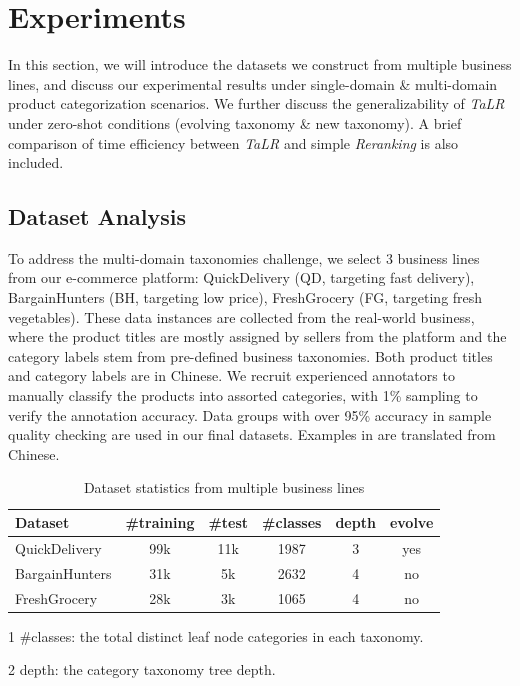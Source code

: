 \section{Experiments}
In this section, we will introduce the datasets we construct from multiple business lines, and discuss our experimental results under single-domain \& multi-domain product categorization scenarios. We further discuss the generalizability of \textit{TaLR} under zero-shot conditions (evolving taxonomy  \& new taxonomy). A brief comparison of time efficiency between \textit{TaLR} and simple \textit{Reranking} is also included. 

\subsection{Dataset Analysis}
To address the multi-domain taxonomies challenge, we select 3 business lines from our e-commerce platform: 
QuickDelivery (QD, targeting fast delivery), BargainHunters (BH, targeting low price), FreshGrocery (FG, targeting fresh vegetables). 
These data instances 
are collected from the real-world business, where the product titles are mostly assigned by sellers from the platform and the category labels stem from pre-defined business taxonomies. Both product titles and category labels are in Chinese. We recruit experienced annotators to manually classify the products into assorted categories, with 1\% sampling to verify the annotation accuracy. Data groups with over 95\% accuracy in sample quality checking are used in our final datasets. 
Examples in  are translated from Chinese.

\begin{table}[th]
\begin{threeparttable}[b]
  \caption{Dataset statistics from multiple business lines}
  \label{tb:dataset}
  \centering
  \begin{tabular}{l|ccccc}
    \toprule
    Dataset & \#training  & \#test  & \#classes & depth  & evolve \\
    \midrule
    \small{QuickDelivery} & 99k & 11k & 1987 & 3 & yes  \\
    \small{BargainHunters} & 31k & 5k & 2632 & 4 & no \\
    \small{FreshGrocery} & 28k & 3k & 1065 & 4 & no \\
    \bottomrule
  \end{tabular}
  \begin{tablenotes}
    \item[1] \#classes: the total distinct leaf node categories in each taxonomy.
    \item[2] depth: the category taxonomy tree depth.
  \end{tablenotes}
  \end{threeparttable}
\end{table}

